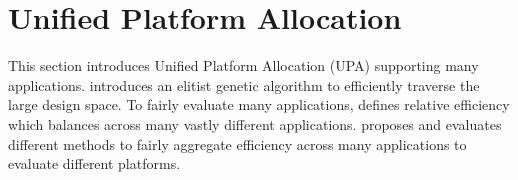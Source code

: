 \vspace{-2pt}
\section{Unified Platform Allocation}
\label{sec:eval}

This section introduces Unified Platform Allocation (UPA) supporting many applications.  introduces an elitist genetic algorithm to efficiently traverse the large design space. 
To fairly evaluate many applications,  defines relative efficiency which balances across many vastly different applications.  proposes and evaluates different methods to fairly aggregate efficiency across many applications to evaluate different platforms.



















